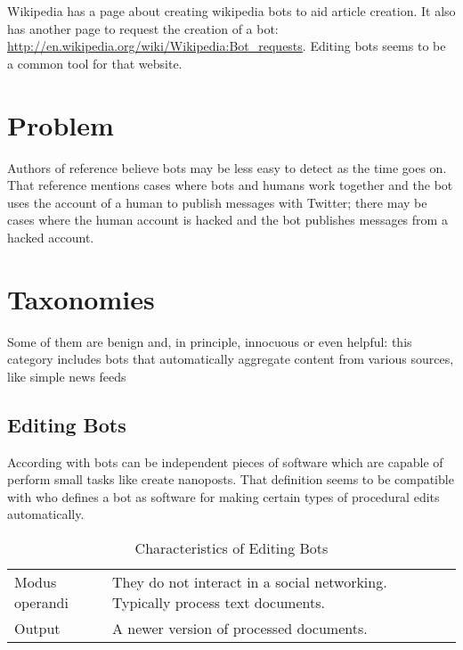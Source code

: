 \documentclass[runningheads,a4paper]{llncs}
\begin{document}
Wikipedia has a page about creating wikipedia bots to aid article creation\cite{wtalk:2014}. It also has another page to request the creation of a bot: \url{http://en.wikipedia.org/wiki/Wikipedia:Bot_requests}. Editing bots seems to be a common tool for that website.



\section{Problem}

Authors of reference\cite{ferrara:2015} believe bots may be less easy to detect as the time goes on. That reference mentions cases where bots and humans work together and the bot uses the account of a human to publish messages with Twitter; there may be cases where the human account is hacked and the bot publishes messages from a hacked account.

\section{Taxonomies}
Some of them are benign and, in principle, innocuous
or even helpful: this category includes bots that automatically aggregate content
from various sources, like simple news feeds\cite{ferrara:2015}
    
\subsection{Editing Bots}
    According with\cite{kuhn:2015} bots can be independent pieces of software which are capable of perform small tasks like create 
    nanoposts. That definition seems to be compatible with\cite{ayers:2008} who defines a bot as software for making certain types 
    of procedural edits automatically.
    
    \begin{table}
        \caption{Characteristics of Editing Bots}
        \begin{tabular}{p{3cm} p{9cm}}
        \hline
        Modus operandi &  They do not interact in a social networking. Typically process text documents. \\ 
        Output                &  A newer version of processed documents. \\
        \hline
        \end{tabular}
        \label{tab:editingb}
    \end{table}
    
\end{document}

